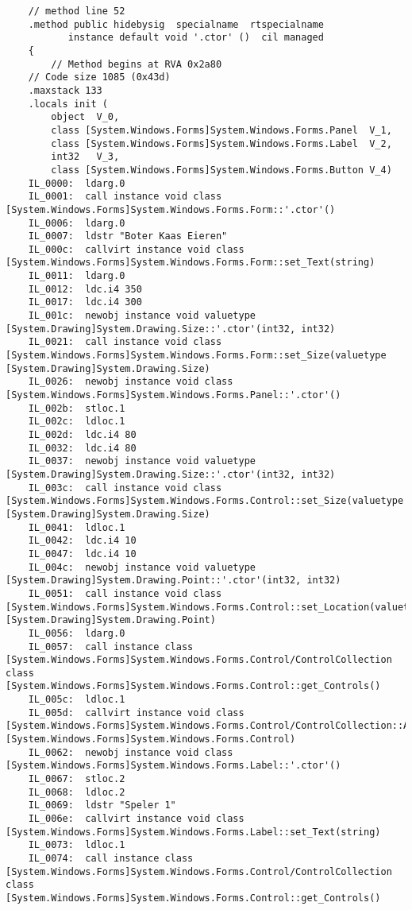 \begin{lstlisting}
    // method line 52
    .method public hidebysig  specialname  rtspecialname 
           instance default void '.ctor' ()  cil managed 
    {
        // Method begins at RVA 0x2a80
	// Code size 1085 (0x43d)
	.maxstack 133
	.locals init (
		object	V_0,
		class [System.Windows.Forms]System.Windows.Forms.Panel	V_1,
		class [System.Windows.Forms]System.Windows.Forms.Label	V_2,
		int32	V_3,
		class [System.Windows.Forms]System.Windows.Forms.Button	V_4)
	IL_0000:  ldarg.0 
	IL_0001:  call instance void class [System.Windows.Forms]System.Windows.Forms.Form::'.ctor'()
	IL_0006:  ldarg.0 
	IL_0007:  ldstr "Boter Kaas Eieren"
	IL_000c:  callvirt instance void class [System.Windows.Forms]System.Windows.Forms.Form::set_Text(string)
	IL_0011:  ldarg.0 
	IL_0012:  ldc.i4 350
	IL_0017:  ldc.i4 300
	IL_001c:  newobj instance void valuetype [System.Drawing]System.Drawing.Size::'.ctor'(int32, int32)
	IL_0021:  call instance void class [System.Windows.Forms]System.Windows.Forms.Form::set_Size(valuetype [System.Drawing]System.Drawing.Size)
	IL_0026:  newobj instance void class [System.Windows.Forms]System.Windows.Forms.Panel::'.ctor'()
	IL_002b:  stloc.1 
	IL_002c:  ldloc.1 
	IL_002d:  ldc.i4 80
	IL_0032:  ldc.i4 80
	IL_0037:  newobj instance void valuetype [System.Drawing]System.Drawing.Size::'.ctor'(int32, int32)
	IL_003c:  call instance void class [System.Windows.Forms]System.Windows.Forms.Control::set_Size(valuetype [System.Drawing]System.Drawing.Size)
	IL_0041:  ldloc.1 
	IL_0042:  ldc.i4 10
	IL_0047:  ldc.i4 10
	IL_004c:  newobj instance void valuetype [System.Drawing]System.Drawing.Point::'.ctor'(int32, int32)
	IL_0051:  call instance void class [System.Windows.Forms]System.Windows.Forms.Control::set_Location(valuetype [System.Drawing]System.Drawing.Point)
	IL_0056:  ldarg.0 
	IL_0057:  call instance class [System.Windows.Forms]System.Windows.Forms.Control/ControlCollection class [System.Windows.Forms]System.Windows.Forms.Control::get_Controls()
	IL_005c:  ldloc.1 
	IL_005d:  callvirt instance void class [System.Windows.Forms]System.Windows.Forms.Control/ControlCollection::Add(class [System.Windows.Forms]System.Windows.Forms.Control)
	IL_0062:  newobj instance void class [System.Windows.Forms]System.Windows.Forms.Label::'.ctor'()
	IL_0067:  stloc.2 
	IL_0068:  ldloc.2 
	IL_0069:  ldstr "Speler 1"
	IL_006e:  callvirt instance void class [System.Windows.Forms]System.Windows.Forms.Label::set_Text(string)
	IL_0073:  ldloc.1 
	IL_0074:  call instance class [System.Windows.Forms]System.Windows.Forms.Control/ControlCollection class [System.Windows.Forms]System.Windows.Forms.Control::get_Controls()

\end{lstlisting}

